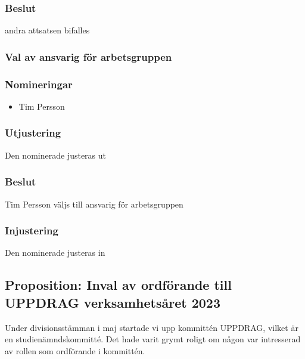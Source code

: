 \documentclass[protokoll]{dvd}
\begin{document}
    \subsubsection*{Beslut}
    \begin{attsatser}
    \item andra attsatsen bifalles
    \end{attsatser}

\subsubsection*{Val av ansvarig för arbetsgruppen}

    \subsubsection*{Nomineringar}

        \begin{itemize}
            \item Tim Persson
        \end{itemize}

        \subsubsection*{Utjustering}
        Den nominerade justeras ut

        \subsubsection*{Beslut}
            \begin{attsatser}
                \item Tim Persson väljs till ansvarig för arbetsgruppen
            \end{attsatser}

        \subsubsection*{Injustering}
        Den nominerade justeras in

\newpage

\subsection{Proposition: Inval av ordförande till UPPDRAG verksamhetsåret 2023}
Under divisionsstämman i maj startade vi upp kommittén UPPDRAG, vilket är en studienämndskommitté.
Det hade varit grymt roligt om någon var intresserad av rollen som ordförande i kommittén.
\end{document}
